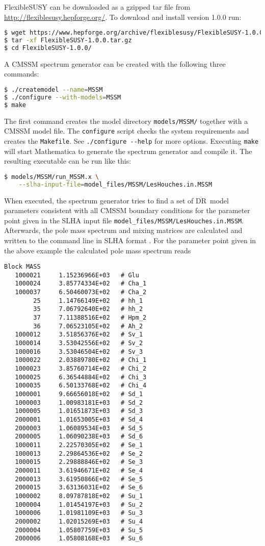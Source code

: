 \documentclass[final,3p,11pt,pdflatex]{elsarticle}
\makeatletter
\newcommand{\fs}{FlexibleSUSY\@\xspace}
\newcommand{\mathematica}{Mathematica\xspace}
\newcommand{\code}[1]{\lstinline|#1|}  %
\newcommand{\textoverline}[1]{$\overline{\mbox{#1}}$}
\newcommand{\DRbar}{\textoverline{DR}\xspace}
\makeatother
\begin{document}
\fs can be downloaded as a gzipped tar file from
\url{http://flexiblesusy.hepforge.org/}.  To download and install
version 1.0.0 run:
%
\begin{lstlisting}[language=bash]
$ wget https://www.hepforge.org/archive/flexiblesusy/FlexibleSUSY-1.0.0.tar.gz
$ tar -xf FlexibleSUSY-1.0.0.tar.gz
$ cd FlexibleSUSY-1.0.0/
\end{lstlisting}%
%
A CMSSM spectrum generator can be created with the following three
commands:
%
\begin{lstlisting}[language=bash]
$ ./createmodel --name=MSSM
$ ./configure --with-models=MSSM
$ make
\end{lstlisting}%
%
The first command creates the model directory \code{models/MSSM/}
together with a CMSSM model file.  The \code{configure} script checks
the system requirements and creates the \code{Makefile}.  See
\code{./configure --help} for more options.  Executing \code{make}
will start \mathematica to generate the spectrum generator and compile
it.  The resulting executable can be run like this:
%
\begin{lstlisting}[language=bash]
$ models/MSSM/run_MSSM.x \
    --slha-input-file=model_files/MSSM/LesHouches.in.MSSM
\end{lstlisting}%
%
When executed, the spectrum generator tries to find a set of \DRbar\
model parameters consistent with all CMSSM boundary conditions for the
parameter point given in the SLHA input file
\code{model_files/MSSM/LesHouches.in.MSSM}.  Afterwards, the pole mass
spectrum and mixing matrices are calculated and written to the command
line in SLHA format \cite{Skands:2003cj,Allanach:2008qq}.  For the
parameter point given in the above example the calculated pole mass
spectrum reads
%
\begin{lstlisting}
Block MASS
   1000021     1.15236966E+03   # Glu
   1000024     3.85774334E+02   # Cha_1
   1000037     6.50460073E+02   # Cha_2
        25     1.14766149E+02   # hh_1
        35     7.06792640E+02   # hh_2
        37     7.11388516E+02   # Hpm_2
        36     7.06523105E+02   # Ah_2
   1000012     3.51856376E+02   # Sv_1
   1000014     3.53042556E+02   # Sv_2
   1000016     3.53046504E+02   # Sv_3
   1000022     2.03889780E+02   # Chi_1
   1000023     3.85760714E+02   # Chi_2
   1000025     6.36544884E+02   # Chi_3
   1000035     6.50133768E+02   # Chi_4
   1000001     9.66656018E+02   # Sd_1
   1000003     1.00983181E+03   # Sd_2
   1000005     1.01651873E+03   # Sd_3
   2000001     1.01653005E+03   # Sd_4
   2000003     1.06089534E+03   # Sd_5
   2000005     1.06090238E+03   # Sd_6
   1000011     2.22570305E+02   # Se_1
   1000013     2.29864536E+02   # Se_2
   1000015     2.29888846E+02   # Se_3
   2000011     3.61946671E+02   # Se_4
   2000013     3.61950866E+02   # Se_5
   2000015     3.63136031E+02   # Se_6
   1000002     8.09787818E+02   # Su_1
   1000004     1.01454197E+03   # Su_2
   1000006     1.01981109E+03   # Su_3
   2000002     1.02015269E+03   # Su_4
   2000004     1.05807759E+03   # Su_5
   2000006     1.05808168E+03   # Su_6
\end{lstlisting}
\end{document}
